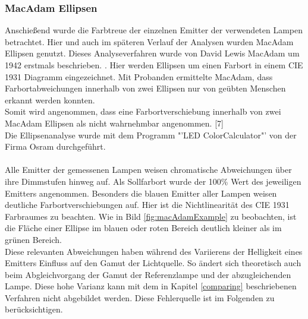 \documentclass[11pt]{scrartcl}
\begin{document}
\subsubsection{MacAdam Ellipsen}
Anschießend wurde die Farbtreue der einzelnen Emitter der verwendeten Lampen betrachtet. Hier und auch im späteren Verlauf der Analysen wurden MacAdam Ellipsen
genutzt. Dieses Analyseverfahren wurde von David Lewis MacAdam um 1942 erstmals beschrieben. \cite{macAdam}. Hier werden Ellipsen um einen Farbort in einem CIE
1931 Diagramm eingezeichnet. Mit Probanden ermittelte MacAdam, dass Farbortabweichungen innerhalb von zwei Ellipsen nur von geübten Menschen erkannt werden
konnten.\\
Somit wird angenommen, dass eine Farbortverschiebung innerhalb von zwei MacAdam Ellipsen als nicht wahrnehmbar angenommen. \cite{macAdamEllipses}[7]\\
Die Ellipsenanalyse wurde mit dem Programm "'LED ColorCalculator"' von der Firma Osram durchgeführt. \cite{osram}\\
\\
Alle Emitter der gemessenen Lampen weisen chromatische Abweichungen über ihre Dimmstufen hinweg auf. Als Sollfarbort wurde der 100\% Wert des jeweiligen Emitters
angenommen. Besonders die blauen Emitter aller Lampen weisen deutliche Farbortverschiebungen auf. Hier ist die Nichtlinearität des CIE 1931 Farbraumes zu
beachten. Wie in Bild \ref{fig:macAdamExample} zu beobachten, ist die Fläche einer Ellipse im blauen oder roten Bereich deutlich kleiner als im grünen Bereich.\\
Diese relevanten Abweichungen haben während des Variierens der Helligkeit eines Emitters Einfluss auf den Gamut der Lichtquelle. So ändert sich theoretisch auch
beim Abgleichvorgang der Gamut der Referenzlampe und der abzugleichenden Lampe. Diese hohe Varianz kann mit dem in Kapitel \ref{comparing} beschriebenen Verfahren
nicht abgebildet werden. Diese Fehlerquelle ist im Folgenden zu berücksichtigen.
\end{document}
